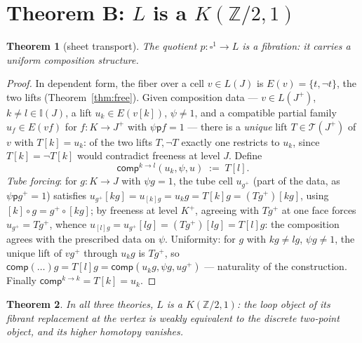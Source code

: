 \documentclass[11pt]{amsart}
\newtheorem{thm}{Theorem}[section]
\theoremstyle{definition}
\newcommand{\I}{\mathbb{I}}
\newcommand{\comp}{\mathsf{comp}}
\newcommand{\Ldash}{L}
\begin{document}
\section{Theorem B: $\Ldash$ is a $K(\mathbb{Z}/2, 1)$}
\label{sec:kz2}

\begin{thm}[sheet transport]
  \label{thm:fib}
  The quotient $p : \square^1 \to \Ldash$ is a fibration: it
  carries a uniform composition structure.
\end{thm}

\begin{proof}
  In dependent form, the fiber over a cell $v \in \Ldash(J)$ is
  $E(v) = \{t, \neg t\}$, the two lifts (Theorem~\ref{thm:free}).
  Given composition data --- $v \in \Ldash(J^{+})$,
  $k \neq l \in \I(J)$, a lift $u_k \in E(v[k])$, $\psi \neq 1$,
  and a compatible partial family $u_f \in E(vf)$ for
  $f : K \to J^{+}$ with $\psi \mathsf{p} f = 1$ --- there is a
  \emph{unique} lift $T \in \mathcal{T}(J^{+})$ of $v$ with
  $T[k] = u_k$: of the two lifts $T, \neg T$ exactly one restricts
  to $u_k$, since $T[k] = \neg T[k]$ would contradict freeness at
  level $J$.  Define
  \[
    \comp^{k \to l}(u_k, \psi, u) \;:=\; T[l].
  \]
  \emph{Tube forcing}: for $g : K \to J$ with $\psi g = 1$, the
  tube cell $u_{g^{+}}$ (part of the data, as
  $\psi \mathsf{p} g^{+} = 1$) satisfies
  $u_{g^{+}}[kg] = u_{[k]g} = u_k g = T[k] g = (T g^{+})[kg]$,
  using $[k] \circ g = g^{+} \circ [kg]$; by freeness at level
  $K^{+}$, agreeing with $T g^{+}$ at one face forces
  $u_{g^{+}} = T g^{+}$, whence
  $u_{[l]g} = u_{g^{+}}[lg] = (T g^{+})[lg] = T[l] g$: the
  composition agrees with the prescribed data on $\psi$.
  Uniformity: for $g$ with $kg \neq lg$, $\psi g \neq 1$, the
  unique lift of $v g^{+}$ through $u_k g$ is $T g^{+}$, so
  $\comp(\dots) g = T[l] g = \comp(u_k g, \psi g, u g^{+})$ ---
  naturality of the construction.  Finally
  $\comp^{k \to k} = T[k] = u_k$.
\end{proof}

\begin{thm}
  \label{thm:kz2}
  In all three theories, $\Ldash$ is a $K(\mathbb{Z}/2, 1)$: the
  loop object of its fibrant replacement at the vertex is weakly
  equivalent to the discrete two-point object, and its higher
  homotopy vanishes.
\end{thm}
\end{document}
